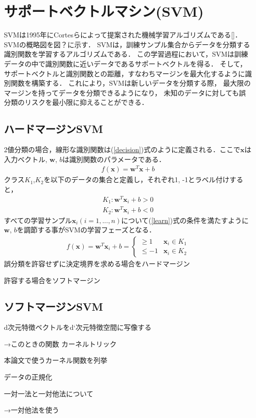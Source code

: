 \section{サポートベクトルマシン(SVM)}
SVMは1995年にCortesらによって提案された機械学習アルゴリズムである[\cite{svm}]．
SVMの概略図を図？に示す．
SVMは，訓練サンプル集合からデータを分類する識別関数を学習するアルゴリズムである．
この学習過程において，SVMは訓練データの中で識別関数に近いデータであるサポートベクトルを得る．
そして，サポートベクトルと識別関数との距離，すなわちマージンを最大化するように識別関数を構築する．
これにより，SVMは新しいデータを分類する際，
最大限のマージンを持ってデータを分類できるようになり，
未知のデータに対しても誤分類のリスクを最小限に抑えることができる．
\subsection{ハードマージンSVM}
2値分類の場合，線形な識別関数は(\ref{decision})式のように定義される．ここで$\boldsymbol{x}$は入力ベクトル,
 $\boldsymbol{w}$, $b$は識別関数のパラメータである．
\begin{align}
    \label{decision}
f(\boldsymbol{x}) = \boldsymbol{w}^T \boldsymbol{x} + b
\end{align}
クラス$K_1$,$K_2$を以下のデータの集合と定義し，それぞれ1, -1とラベル付けすると，
\begin{align*}
    K_1:\boldsymbol{w}^T \boldsymbol{x}_i + b > 0\\
    K_2:\boldsymbol{w}^T \boldsymbol{x}_i + b < 0
\end{align*}
すべての学習サンプル$\boldsymbol{x}_i(i=1,...,n)$について(\ref{learn})式の条件を満たすように
$\boldsymbol{w}$, $b$を調節する事がSVMの学習フェーズとなる．
\begin{align}
    \label{learn}
    f(\boldsymbol{x}) = \boldsymbol{w}^T \boldsymbol{x}_i + b =
    \begin{cases}
        \geq 1&  \boldsymbol{x}_i \in K_1 \\
        \leq  -1& \boldsymbol{x}_i \in K_2
    \end{cases}
\end{align}
誤分類を許容せずに決定境界を求める場合をハードマージン

許容する場合をソフトマージン

\subsection{ソフトマージンSVM}

d次元特徴ベクトルをd`次元特徴空間に写像する

→このときの関数
カーネルトリック

本論文で使うカーネル関数を列挙

データの正規化

一対一法と一対他法について

→一対他法を使う



